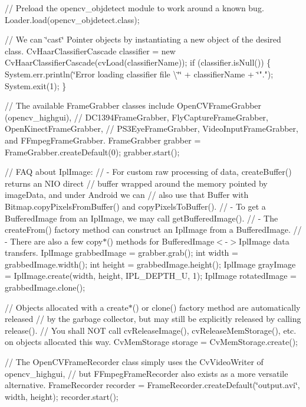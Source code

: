 // Preload the opencv\+\_\+objdetect module to work around a known bug. Loader.\+load(opencv\+\_\+objdetect.\+class);

// We can \char`\"{}cast\char`\"{} Pointer objects by instantiating a new object of the desired class. Cv\+Haar\+Classifier\+Cascade classifier = new Cv\+Haar\+Classifier\+Cascade(cv\+Load(classifier\+Name)); if (classifier.\+is\+Null()) \{ System.\+err.\+println(\char`\"{}\+Error loading classifier file \textbackslash{}\char`\"{}\char`\"{} + classifier\+Name + \char`\"{}"."); System.\+exit(1); \}

// The available Frame\+Grabber classes include Open\+C\+V\+Frame\+Grabber (opencv\+\_\+highgui), // D\+C1394\+Frame\+Grabber, Fly\+Capture\+Frame\+Grabber, Open\+Kinect\+Frame\+Grabber, // P\+S3\+Eye\+Frame\+Grabber, Video\+Input\+Frame\+Grabber, and F\+Fmpeg\+Frame\+Grabber. Frame\+Grabber grabber = Frame\+Grabber.\+create\+Default(0); grabber.\+start();

// F\+A\+Q about Ipl\+Image\+: // -\/ For custom raw processing of data, create\+Buffer() returns an N\+I\+O direct // buffer wrapped around the memory pointed by image\+Data, and under Android we can // also use that Buffer with Bitmap.\+copy\+Pixels\+From\+Buffer() and copy\+Pixels\+To\+Buffer(). // -\/ To get a Buffered\+Image from an Ipl\+Image, we may call get\+Buffered\+Image(). // -\/ The create\+From() factory method can construct an Ipl\+Image from a Buffered\+Image. // -\/ There are also a few copy$\ast$() methods for Buffered\+Image$<$-\/$>$Ipl\+Image data transfers. Ipl\+Image grabbed\+Image = grabber.\+grab(); int width = grabbed\+Image.\+width(); int height = grabbed\+Image.\+height(); Ipl\+Image gray\+Image = Ipl\+Image.\+create(width, height, I\+P\+L\+\_\+\+D\+E\+P\+T\+H\+\_\+U, 1); Ipl\+Image rotated\+Image = grabbed\+Image.\+clone();

// Objects allocated with a create$\ast$() or clone() factory method are automatically released // by the garbage collector, but may still be explicitly released by calling release(). // You shall N\+O\+T call cv\+Release\+Image(), cv\+Release\+Mem\+Storage(), etc. on objects allocated this way. Cv\+Mem\+Storage storage = Cv\+Mem\+Storage.\+create();

// The Open\+C\+V\+Frame\+Recorder class simply uses the Cv\+Video\+Writer of opencv\+\_\+highgui, // but F\+Fmpeg\+Frame\+Recorder also exists as a more versatile alternative. Frame\+Recorder recorder = Frame\+Recorder.\+create\+Default(\char`\"{}output.\+avi\char`\"{}, width, height); recorder.\+start();

